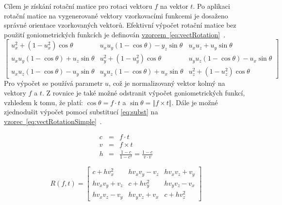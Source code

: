 \documentclass[czech,master]{diploma}
\newcommand{\fromVect}{f}
\newcommand{\toVect}{t}
\begin{document}
Cílem je získání rotační matice pro rotaci vektoru \(\fromVect\) na vektor \(\toVect\). Po aplikaci rotační matice na vygenerované vektory vzorkovacími funkcemi je dosaženo správné orientace vzorkovaných vektorů. Efektivní výpočet rotační matice bez použití goniometrických funkcích je definován \hyperref[eq:vectRotation]{vzorcem~\ref{eq:vectRotation}}~\cite{MollerHughesVectRotation}.
\begin{equation} \label{eq:vectRotation}
  \begin{bmatrix}
    u_x^2 + \left ( 1 - u_x^2\right ) \cos\theta                & u_x u_y \left ( 1 - \cos \theta \right ) - y_z \sin \theta & u_x u_z + u_y \sin \theta                                  \\
    u_x u_y \left ( 1 -  \cos \theta \right ) + u_z \sin \theta & u_y^2 + \left ( 1 - u_y^2\right ) \cos\theta               & u_y u_z \left ( 1 - \cos \theta \right ) - u_x \sin \theta \\
    u_x u_z \left ( 1 - \cos \theta \right ) - u_y \sin \theta  & u_y u_z \left ( 1 - \cos \theta \right ) + u_x \sin \theta & u_z^2 + \left ( 1 - u_z^2\right ) \cos\theta
  \end{bmatrix}
\end{equation}
Pro výpočet se používá parametr \(u\), což je normalizovaný vektor kolmý na vektory \(\fromVect\) a \(\toVect\). Z rovnice je také možné odstranit výpočet goniometrických funkcí, vzhledem k tomu, že platí: \(\cos \theta = \fromVect \cdot \toVect\) a \(\sin \theta = \left\Vert \fromVect \times \toVect \right\Vert\). Dále je možné zjednodušit výpočet pomocí substitucí \hyperref[eq:subst]{\ref{eq:subst}} na \hyperref[eq:vectRotationSimple]{vzorec~\ref{eq:vectRotationSimple}}~\cite{MollerHughesVectRotation}.

\begin{eqnarray} \label{eq:subst}
  c &=& \fromVect \cdot \toVect \nonumber\\
  v &=& \fromVect \times \toVect \nonumber\\
  h &=& \frac{1 - c}{1 - c^2} = \frac{1 - c}{v \cdot v} \nonumber
\end{eqnarray}

\begin{equation} \label{eq:vectRotationSimple}
  R\left ( \fromVect, \toVect \right) = \begin{bmatrix}
    c + h v_x^2     & h v_x v_y - v_z & h v_x v_z + v_y \\
    h v_x v_y + v_z & c + h v_y^2     & h v_y v_z - v_x \\
    h v_x v_z - v_y & h v_y v_z + v_x & c + h v_z^2
  \end{bmatrix}
\end{equation}
\end{document}
